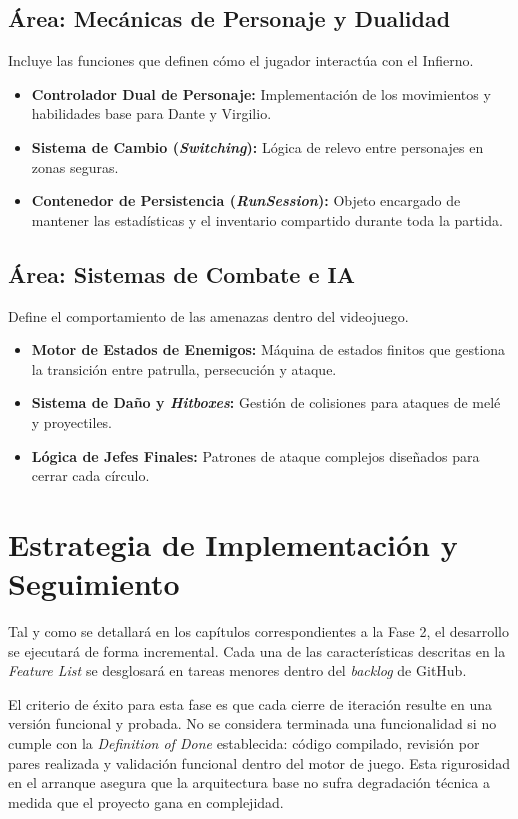 \subsection{Área: Mecánicas de Personaje y Dualidad}
Incluye las funciones que definen cómo el jugador interactúa con el Infierno.
\begin{itemize}
    \item \textbf{Controlador Dual de Personaje:} Implementación de los movimientos y habilidades base para Dante y Virgilio.
    \item \textbf{Sistema de Cambio (\textit{Switching}):} Lógica de relevo entre personajes en zonas seguras.
    \item \textbf{Contenedor de Persistencia (\textit{RunSession}):} Objeto encargado de mantener las estadísticas y el inventario compartido durante toda la partida.
\end{itemize}

\subsection{Área: Sistemas de Combate e IA}
Define el comportamiento de las amenazas dentro del videojuego.
\begin{itemize}
    \item \textbf{Motor de Estados de Enemigos:} Máquina de estados finitos que gestiona la transición entre patrulla, persecución y ataque.
    \item \textbf{Sistema de Daño y \textit{Hitboxes}:} Gestión de colisiones para ataques de melé y proyectiles.
    \item \textbf{Lógica de Jefes Finales:} Patrones de ataque complejos diseñados para cerrar cada círculo.
\end{itemize}

\section{Estrategia de Implementación y Seguimiento}
Tal y como se detallará en los capítulos correspondientes a la Fase 2, el desarrollo se ejecutará de forma incremental. Cada una de las características descritas en la \textit{Feature List} se desglosará en tareas menores dentro del \textit{backlog} de GitHub.

El criterio de éxito para esta fase es que cada cierre de iteración resulte en una versión funcional y probada. No se considera terminada una funcionalidad si no cumple con la \textit{Definition of Done} establecida: código compilado, revisión por pares realizada y validación funcional dentro del motor de juego. Esta rigurosidad en el arranque asegura que la arquitectura base no sufra degradación técnica a medida que el proyecto gana en complejidad.